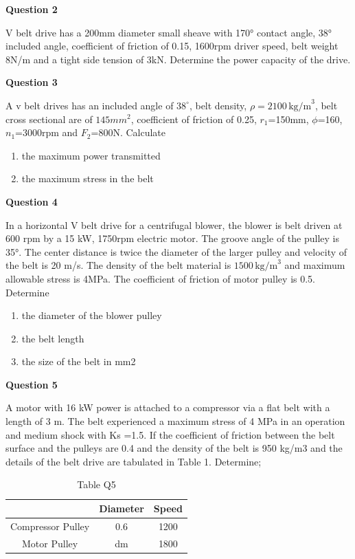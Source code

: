 \documentclass[a4paper, fleqn]{article}
\begin{document}
\newpage
\textbf{Question 2}

V belt drive has a 200mm diameter small sheave with 170° contact angle, 38° included angle, coefficient of friction of 0.15, 1600rpm driver speed, belt weight 8N/m and a tight side tension of 3kN. Determine the power capacity of the drive.

\newpage

\textbf{Question 3}

A v belt drives has an included angle of $38^\circ$, belt density, $\rho=2100 \, \text{kg/m}^3$, belt cross sectional are of $145 mm^2$, coefficient of friction of 0.25, $r_1$=150mm, $\phi$=160, $n_1$=3000rpm and $F_2$=800N. Calculate

\begin{enumerate}[label=(\roman*)]
    \item the maximum power transmitted
    \item the maximum stress in the belt
\end{enumerate}

\newpage

\textbf{Question 4}

In a horizontal V belt drive for a centrifugal blower, the blower is belt driven at 600 rpm by a 15 kW, 1750rpm electric motor. The groove angle of the pulley is 35°. The center distance is twice the diameter of the larger pulley and velocity of the belt is 20 m/s. The density of the belt material is $1500 \, \text{kg/m}^3$ and maximum allowable stress is 4MPa. The coefficient of friction of motor pulley is 0.5. Determine

\begin{enumerate}[label=(\roman*)]
    \item the diameter of the blower pulley
    \item the belt length
    \item the size of the belt in mm2
\end{enumerate}

\newpage

\textbf{Question 5}

A motor with 16 kW power is attached to a compressor via a flat belt with a length of 3 m.
The belt experienced a maximum stress of 4 MPa in an operation and medium shock with
Ks =1.5. If the coefficient of friction between the belt surface and the pulleys are 0.4 and the density of the belt is 950 kg/m3 and the details of the belt drive are tabulated in Table 1. Determine;

\begin{table}[h]
\centering
\begin{tabular}{|c|c|c|}
\hline
 & Diameter & Speed \\
\hline
 Compressor Pulley & 0.6 & 1200 \\
 Motor Pulley & dm & 1800 \\
\hline
\end{tabular}
\caption{Table Q5}
\end{table}
\end{document}
